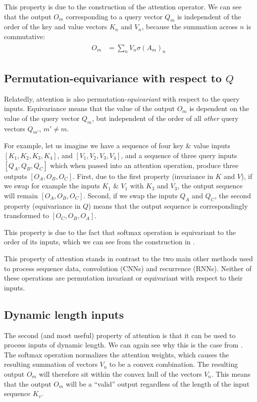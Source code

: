 This property is due to the construction of the attention operator. We can see that the output $O_m$ corresponding to a query vector $Q_m$ is independent of the order of the key and value vectors $K_n$ and $V_n$, because the summation across $n$ is commutative:
\begin{align}
\label{eqn:attn-perm-invariance}
\begin{aligned}
    O_m &= \sum_n V_n \sigma(A_{m})_n
\end{aligned}
\end{align}

\subsection{Permutation-equivariance with respect to $Q$}

Relatedly, attention is also permutation-\textit{equivariant} with respect to the query inputs. Equivariance means that the value of the output $O_m$ is dependent on the value of the query vector $Q_m$, but independent of the order of all \textit{other} query vectors $Q_{m'}$, $m' ≠ m$.

For example, let us imagine we have a sequence of four key \& value inputs $[K_1, K_2, K_3, K_4]$, and $[V_1, V_2, V_3, V_4]$, and a sequence of three query inputs $[Q_A, Q_B, Q_C]$ which when passed into an attention operation, produce three outputs $[O_A, O_B, O_C]$. First, due to the first property (invariance in $K$ and $V$), if we swap for example the inputs $K_1$ \& $V_1$ with $K_3$ and $V_3$, the output sequence will remain $[O_A, O_B, O_C]$. Second, if we swap the inputs $Q_A$ and $Q_C$, the second property (equivariance in $Q$) means that the output sequence is correspondingly transformed to $[O_C, O_B, O_A]$.

This property is due to the fact that softmax operation is equivariant to the order of its inputs, which we can see from the construction in .

This property of attention stands in contrast to the two main other methods used to process sequence data, convolution (CNNs) and recurrence (RNNs). Neither of these operations are permutation invariant or equivariant with respect to their inputs.

\subsection{Dynamic length inputs}

The second (and most useful) property of attention is that it can be used to process inputs of dynamic length. We can again see why this is the case from . The softmax operation normalizes the attention weights, which causes the resulting summation of vectors $V_n$ to be a convex combination. The resulting output $O_m$ will therefore sit within the convex hull of the vectors $V_n$. This means that the output $O_m$ will be a ``valid'' output regardless of the length of the input sequence $K_v$.


